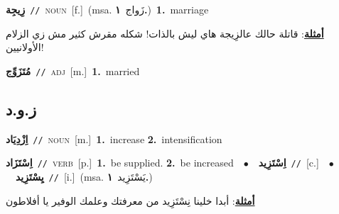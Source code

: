 \documentclass[10pt,a4paper,twoside]{article} %
\begin{document}
\begin{multicols}{2}
{\setlength\topsep{0pt}\textbf{\foreignlanguage{arabic}{زِيجِة}}\ {\color{gray}\texttt{//}\color{black}}\ \textsc{noun}\ [f.]\ \color{gray}(msa. \foreignlanguage{arabic}{زَواج}~\foreignlanguage{arabic}{\textbf{١.}})\color{black}\ \textbf{1.}~marriage\  \begin{flushright}\color{gray}\foreignlanguage{arabic}{\textbf{\underline{\foreignlanguage{arabic}{أمثلة}}}: قاتلة حالك عالزِيجة هاي ليش بالذات! شكله مقرش كثير مش زي الزلام الأولانيين!}\end{flushright}\color{black}} \vspace{2mm}

{\setlength\topsep{0pt}\textbf{\foreignlanguage{arabic}{مُتَزَوِّج}}\ {\color{gray}\texttt{//}\color{black}}\ \textsc{adj}\ [m.]\ \textbf{1.}~married\ } \vspace{2mm}

\vspace{-3mm}
\subsection*{\color{blue}\foreignlanguage{arabic}{ز.و.د}\color{blue}{}} 

{\setlength\topsep{0pt}\textbf{\foreignlanguage{arabic}{اِزْدِيَاد}}\ {\color{gray}\texttt{//}\color{black}}\ \textsc{noun}\ [m.]\ \textbf{1.}~increase  \textbf{2.}~intensification\ } \vspace{2mm}

{\setlength\topsep{0pt}\textbf{\foreignlanguage{arabic}{اِسْتَزَاد}}\ {\color{gray}\texttt{//}\color{black}}\ \textsc{verb}\ [p.]\ \textbf{1.}~be supplied.  \textbf{2.}~be increased\ \ $\bullet$\ \ \setlength\topsep{0pt}\textbf{\foreignlanguage{arabic}{اِسْتَزِيد}}\ {\color{gray}\texttt{//}\color{black}}\ [c.]\ \ $\bullet$\ \ \setlength\topsep{0pt}\textbf{\foreignlanguage{arabic}{يِسْتَزِيد}}\ {\color{gray}\texttt{//}\color{black}}\ [i.]\ \color{gray}(msa. \foreignlanguage{arabic}{يَسْتَزِيد}~\foreignlanguage{arabic}{\textbf{١.}})\color{black}\  \begin{flushright}\color{gray}\foreignlanguage{arabic}{\textbf{\underline{\foreignlanguage{arabic}{أمثلة}}}: أبدا خلينا نِسْتَزِيد من معرفتك وعلمك الوفير يا أفلاطون}\end{flushright}\color{black}} \vspace{2mm}


\end{multicols}
\end{document}
